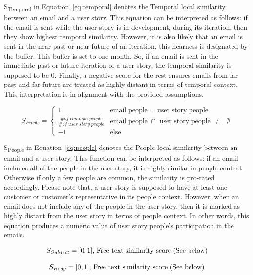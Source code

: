 S\textsubscript{Temporal} in Equation~\ref{eq:temporal} denotes the Temporal local similarity between an email and a user story. This equation can be interpreted as follows: if the email is sent while the user story is in development, during its iteration, then they show highest temporal similarity. However, it is also likely that an email is sent in the near past or near future of an iteration, this nearness is designated by the buffer. This buffer is set to one month. So, if an email is sent in the immediate past or future iteration of a user story, the temporal similarity is supposed to be 0. Finally, a negative score for the rest ensures emails from far past and far future are treated as highly distant in terms of temporal context. This interpretation is in alignment with the provided assumptions.

\begin{equation}
\label{eq:people}
S_{People} =
\begin{cases}
1 & \mbox{email people = user story people}\\
\frac{\# of \; common \; people}{\# of \;user \;story \;people} & \mbox{email people $\cap$ user story people $\neq$ $\emptyset$} \\
-1 & \mbox{else}
\end{cases}
\end{equation}

S\textsubscript{People} in Equation~\ref{eq:people} denotes the People local similarity between an email and a user story. This function can be interpreted as follows: if an email includes all of the people in the user story, it is highly similar in people context. Otherwise if only a few people are common, the similarity is pro-rated accordingly. Please note that, a user story is supposed to have at least one customer or customer's representative in its people context. However, when an email does not include any of the people in the user story, then it is marked as highly distant from the user story in terms of people context. In other words, this equation produces a numeric value of user story people's participation in the emails.

\begin{equation}
\label{eq:subject}
S_{Subject} = [0, 1]\mbox{, Free text similarity score (See below)}\\
\end{equation}

\begin{equation}
\label{eq:body}
S_{Body} = [0, 1]\mbox{, Free text similarity score (See below)}\\
\end{equation}

